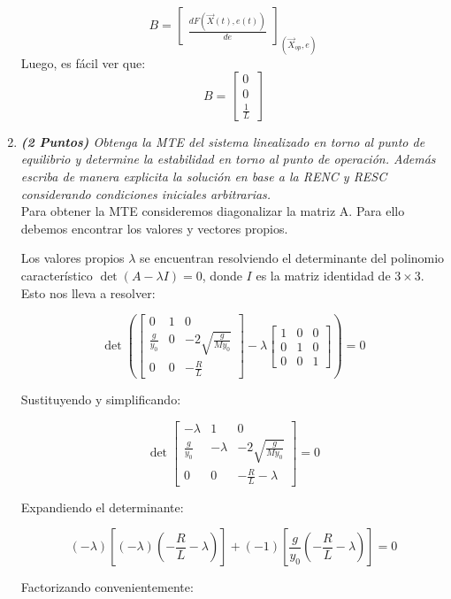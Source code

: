 \begin{enumerate}
\[
B = 
\begin{bmatrix}
\frac{d F(\Vec{X}(t), e(t))}{de}
\end{bmatrix}_{(\Vec{X}_{op}, e)}
\]
Luego, es fácil ver que:
\[
B=
\begin{bmatrix}
0 \\
0 \\
\frac{1}{L}
\end{bmatrix}
\]

\item \textit{\textbf{(2 Puntos)} Obtenga la MTE del sistema linealizado en torno al punto de equilibrio y determine la estabilidad en torno al punto de operación. Además escriba de manera explicita la solución en base a la RENC y RESC considerando condiciones iniciales arbitrarias.}\\

Para obtener la MTE consideremos diagonalizar la matriz A. Para ello debemos encontrar los valores y vectores propios.

Los valores propios \( \lambda \) se encuentran resolviendo el determinante del polinomio característico \( \det(A - \lambda I) = 0 \), donde \( I \) es la matriz identidad de \(3 \times 3\). Esto nos lleva a resolver:

\[
\det\left(
\begin{bmatrix}
0 & 1 & 0 \\
\frac{g}{y_0} & 0 & -2\sqrt{\frac{g}{M y_0}} \\
0 & 0 & -\frac{R}{L}
\end{bmatrix}
- \lambda
\begin{bmatrix}
1 & 0 & 0 \\
0 & 1 & 0 \\
0 & 0 & 1
\end{bmatrix}
\right) = 0
\]

Sustituyendo y simplificando:

\[
\det
\begin{bmatrix}
-\lambda & 1 & 0 \\
\frac{g}{y_0} & -\lambda & -2\sqrt{\frac{g}{M y_0}} \\
0 & 0 & -\frac{R}{L} - \lambda
\end{bmatrix} = 0
\]

Expandiendo el determinante:

\[
\left( -\lambda \right) \left[ \left( -\lambda \right) \left( -\frac{R}{L} - \lambda \right) \right] + (-1)\left[ \frac{g}{y_0} \left( -\frac{R}{L} - \lambda \right) \right] = 0
\]

Factorizando convenientemente:


\end{enumerate}

